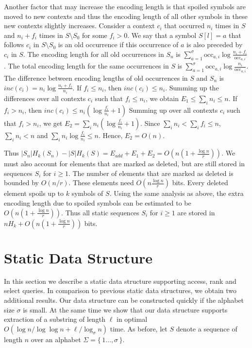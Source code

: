 \documentclass[11pt]{article}\usepackage{fullpage}
\newcommand{\occ}{\mathrm{occ}}
\begin{document}
Another factor that may increase the encoding length  is that spoiled symbols are moved to new contexts and thus the encoding length of all other symbols in these new contexts slightly increases. Consider a context $c_i$  that occurred $n_i$ times in $S$ and $n_i+f_i$ times in $S\setminus S_0$ for some $f_i>0$. 
We say that a symbol $S[l]=a$ that follows $c_i$ in $S\setminus S_0$ is an old occurrence if this occurrence of $a$ is also preceded by $c_i$ in $S$. 
The  encoding length for all old occurrences in $S_n$ is $\sum_{a=1}^{\sigma} \occ_{a,i}\log\frac{n_i+f_i}{\occ_{a,i}}$. The total encoding length for the same occurrences in $S$ is  $\sum_{a=1}^{\sigma} \occ_{a,i}\log\frac{n_i}{\occ_{a,i}}$.
The difference between encoding lengths of old occurrences in $S$ and $S_n$ 
is $inc(c_i)=n_i\log \frac{n_i+f_i}{n_i}$. If $f_i\le n_i$, then $inc(c_i)\le n_i$. Summing up the differences over all  contexts $c_i$ such that 
$f_i\le n_i$, we obtain $E_1\le \sum_i n_i\le n$. 
If $f_i> n_i$, then $inc(c_i)\le n_i(\log\frac{f_i}{n_i} +1)$
Summing up over all contexts $c_i$ such that $f_i>n_i$, we get  $E_2=\sum_{i} n_i(\log \frac{f_i}{n_i}+1)$. Since $\sum_{i} n_i < \sum_{i} f_i \le n$, 
$\sum_i n_i < n$ and $\sum_i n_i\log\frac{f_i}{n_i} \le n$.
Hence, $E_2=O(n)$.  

Thus $|S_n|H_k(S_n) - |S|H_k(S)=E_{add}+E_1+E_2=O(n(1+\frac{\log n}{r}))$.  
We must also account for elements that are marked as deleted, but are still stored in sequences $S_i$ for $i\ge 1$. The number of elements that are marked as deleted is bounded by $O(n/r)$. These elements  need $O(n\frac{\log n}{r})$ bits. Every deleted element spoils up to $k$ symbols of $S$. Using the same analysis as above, the extra encoding length due to spoiled symbols can be estimated to be $O(n(1+\frac{\log n}{r}))$. Thus all static sequences $S_i$ for $i\ge 1$ are stored in $ nH_k+ O(n(1+\frac{\log n}{r}))$ bits.




\section{Static Data Structure}
\label{sec:construct}
In this section we describe a  static data structure supporting 
access, rank and select queries. In comparison to previous static data structures, we obtain two additional results. Our data structure can be constructed quickly if the alphabet size $\sigma$ is small.  At the same time we show that our data structure supports extraction of a  substring of length $\ell$ in optimal $O(\log n/\log\log n +\ell/\log_{\sigma}n)$ time. 
As before, let $S$ denote a sequence of length $n$ over an  alphabet $\Sigma=\{\,1\ldots,\sigma\,\}$. 
\end{document}
